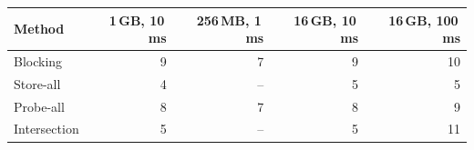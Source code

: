 \begin{tabular}{lrrrr}
\toprule
Method & 1\,GB, 10\,ms & 256\,MB, 1\,ms & 16\,GB, 10\,ms & 16\,GB, 100\,ms\\
\midrule
Blocking & 9 & 7 & 9 & 10\\
Store-all & 4 & -- & 5 & 5\\
Probe-all & 8 & 7 & 8 & 9\\
Intersection & 5 & -- & 5 & 11\\
\bottomrule
\end{tabular}
